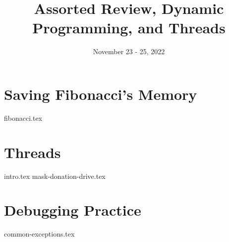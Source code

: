 \documentclass[11pt]{exam}
\title{Assorted Review, Dynamic Programming, and Threads}
\date{November 23 - 25, 2022}
\begin{document}
\maketitle


\section{Saving Fibonacci's Memory}
\begin{questions}
{fibonacci.tex}
\end{questions}
\pagebreak

\section{Threads}
\begin{questions}
{intro.tex}
{mask-donation-drive.tex}
\end{questions}


\pagebreak
\section{Debugging Practice}
\begin{questions}
{common-exceptions.tex}
\end{questions}
\end{document}
